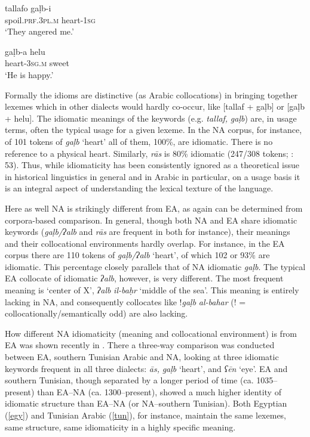 \documentclass[output=paper]{langsci/langscibook}
\begin{document}
\ea\label{galb}
\ea
\gll tallafo gaḷb-i\\
     spoil.\textsc{prf.3pl.m} heart-1\textsc{sg}\\
\glt ‘They angered me.’

\ex 
\gll gaḷb-a helu\\
     heart-\textsc{3sg.m} sweet\\
\glt ‘He is happy.’\label{helu}
\z
\z

Formally the idioms are distinctive (as Arabic collocations) in bringing together lexemes which in other dialects would hardly co-occur, like [tallaf + gaḷb] or [gaḷb + helu]. The idiomatic meanings of the keywords (e.g. \textit{tallaf,} \textit{gaḷb}) are, in usage terms, often the typical usage for a given lexeme. In the NA corpus, for instance, of 101 tokens of \textit{gaḷb} ‘heart’ all of them, 100\%, are idiomatic. There is no reference to a physical heart. Similarly, \textit{rās} is 80\% idiomatic (247/308 tokens; \citealt{Ritt-Benmimounetc2017}: 53). Thus, while idiomaticity has been consistently ignored as a theoretical issue in historical linguistics in general and in Arabic in particular, on a usage basis it is an integral aspect of understanding the lexical texture of the language. 

Here as well NA is strikingly different from EA, as again can be determined from corpora-based comparison. In general, though both NA and EA share idiomatic keywords (\textit{gaḷb/ʔalb} and \textit{rās} are frequent in both for instance), their meanings and their collocational environments hardly overlap. For instance, in the EA corpus there are 110 tokens of \textit{gaḷb/ʔalb} ‘heart’, of which 102 or 93\% are idiomatic. This percentage closely parallels that of NA idiomatic \textit{gaḷb}. The typical EA collocate of idiomatic \textit{ʔalb}, however, is very different. The most frequent meaning is ‘center of X’, \textit{ʔalb} \textit{il-baḥr} ‘middle of the sea’. This meaning is entirely lacking in NA, and consequently collocates like !\textit{gaḷb} \textit{al-bahar} (! = collocationally/semantically odd) are also lacking.

How different NA idiomaticity (meaning and collocational environment) is from EA was shown recently in \citet{Ritt-Benmimounetc2017}. There a three-way comparison was conducted between EA, southern Tunisian Arabic and NA, looking at three idiomatic keywords frequent in all three dialects: \textit{{\R}ās,} \textit{gaḷb} ‘heart’, and \textit{ʕēn} ‘eye’. EA and southern Tunisian, though separated by a longer period of time (ca. 1035–present) than EA–NA (ca. 1300–present), showed a much higher identity of idiomatic structure than EA–NA (or NA–southern Tunisian). Both Egyptian (\ref{egy}) and Tunisian Arabic (\ref{tun}), for instance, maintain the same lexemes, same structure, same idiomaticity in a highly specific meaning.
\end{document}
